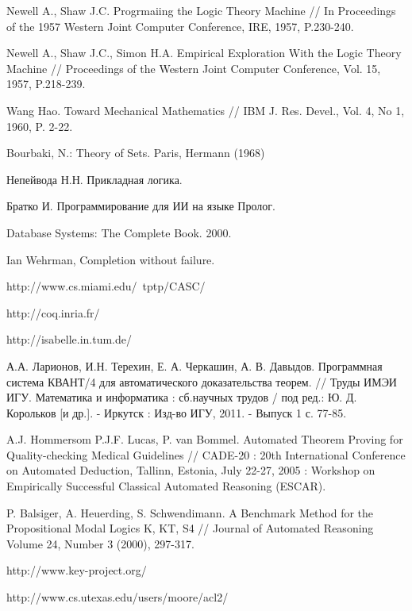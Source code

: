 \begin{thebibliography}{99}
 Newell A., Shaw J.C. Progrmaiing the Logic Theory Machine // In Proceedings of the 1957 Western Joint Computer Conference, IRE, 1957, P.230-240.

 Newell A., Shaw J.C., Simon H.A. Empirical Exploration With the Logic Theory Machine // Proceedings of the Western Joint Computer Conference, Vol. 15, 1957, P.218-239.

 Wang Hao. Toward Mechanical Mathematics // IBM J. Res. Devel., Vol. 4, No 1, 1960, P. 2-22. 

 Bourbaki, N.: Theory of Sets. Paris, Hermann (1968)

 Непейвода Н.Н. Прикладная логика.

 Братко И. Программирование для ИИ на языке Пролог.

 Database Systems: The Complete Book. 2000.

 Ian Wehrman, Completion without failure.

 http://www.cs.miami.edu/~tptp/CASC/

 http://coq.inria.fr/

 http://isabelle.in.tum.de/

 А.А. Ларионов, И.Н. Терехин, Е. А. Черкашин, А. В. Давыдов.
Программная система КВАНТ/4 для автоматического доказательства теорем.
// Труды ИМЭИ ИГУ. Математика и информатика : сб.научных трудов / под
ред.: Ю. Д. Корольков [и др.]. - Иркутск : Изд-во ИГУ, 2011. - Выпуск
1 с. 77-85.

 A.J. Hommersom P.J.F. Lucas, P. van Bommel. Automated Theorem Proving for Quality-checking Medical Guidelines // CADE-20 : 20th International Conference on Automated Deduction, Tallinn, Estonia, July 22-27, 2005 : Workshop on Empirically Successful Classical Automated Reasoning (ESCAR).

 P. Balsiger, A. Heuerding, S. Schwendimann. A Benchmark Method for the Propositional Modal Logics K, KT, S4 // Journal of Automated Reasoning Volume 24, Number 3 (2000), 297-317.


 http://www.key-project.org/

 http://www.cs.utexas.edu/users/moore/acl2/


\end{thebibliography}



